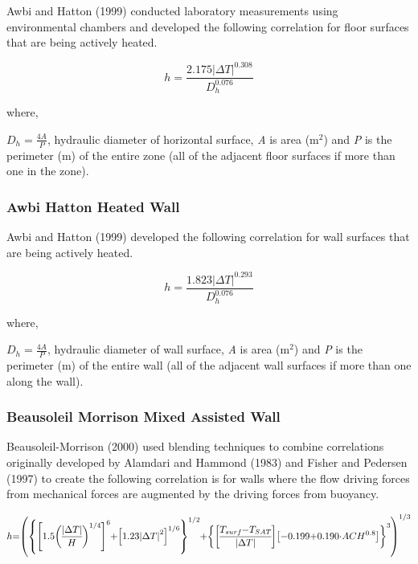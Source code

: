 Awbi and Hatton (1999) conducted laboratory measurements using environmental chambers and developed the following correlation for floor surfaces that are being actively heated.

\begin{equation}
h = \frac{{2.175{{\left| {\Delta T} \right|}^{0.308}}}}{{D_h^{0.076}}}
\end{equation}

where,

\({D_h} = \frac{{4A}}{P}\), hydraulic diameter of horizontal surface, \emph{A} is area (m\(^{2}\)) and \emph{P} is the perimeter (m) of the entire zone (all of the adjacent floor surfaces if more than one in the zone).

\subsubsection{Awbi Hatton Heated Wall}\label{awbi-hatton-heated-wall}

Awbi and Hatton (1999) developed the following correlation for wall surfaces that are being actively heated.

\begin{equation}
h = \frac{{1.823{{\left| {\Delta T} \right|}^{0.293}}}}{{D_h^{0.076}}}
\end{equation}

where,

\({D_h} = \frac{{4A}}{P}\), hydraulic diameter of wall surface, \emph{A} is area (m\(^{2}\)) and \emph{P} is the perimeter (m) of the entire wall (all of the adjacent wall surfaces if more than one along the wall).

\subsubsection{Beausoleil Morrison Mixed Assisted Wall}\label{beausoleil-morrison-mixed-assisted-wall}

Beausoleil-Morrison (2000) used blending techniques to combine correlations originally developed by Alamdari and Hammond (1983) and Fisher and Pedersen (1997) to create the following correlation is for walls where the flow driving forces from mechanical forces are augmented by the driving forces from buoyancy.

\begin{equation}
\medmuskip=0mu
\thinmuskip=0mu
\thickmuskip=0mu
\nulldelimiterspace=0pt
\scriptspace=0pt
h = \left(
\left\{
\left[1.5\left(\frac{\left|\Delta T\right|}{H}\right)^{1/4}\right]^6 +
\left[1.23\left|\Delta T\right|^2\right]^{1/6}
\right\}^{1/2} +
\left\{
\left[\frac{T_{surf}-T_{SAT}}{\left|\Delta T\right|}\right]
\left[-0.199+0.190\cdot ACH^{0.8}\right]
\right\}^3
\right)^{1/3}
\end{equation}

